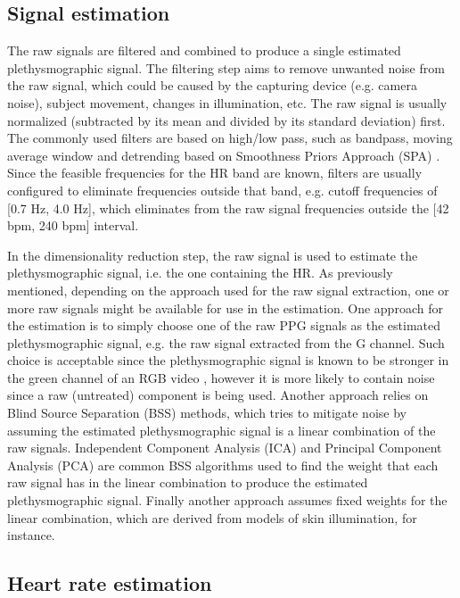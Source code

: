 \subsection{Signal estimation}

The raw signals are filtered and combined to produce a single estimated plethysmographic signal. The filtering step aims to remove unwanted noise from the raw signal, which could be caused by the capturing device (e.g. camera noise), subject movement, changes in illumination, etc. The raw signal is usually normalized (subtracted by its mean and divided by its standard deviation) first. The commonly used filters are based on high/low pass, such as bandpass, moving average window and detrending based on Smoothness Priors Approach (SPA) \parencite{eleuteri2012efficient}. Since the feasible frequencies for the HR band are known, filters are usually configured to eliminate frequencies outside that band, e.g. cutoff frequencies of [0.7 Hz, 4.0 Hz], which eliminates from the raw signal frequencies outside the [42 bpm, 240 bpm] interval.

In the dimensionality reduction step, the raw signal is used to estimate the plethysmographic signal, i.e. the one containing the HR. As previously mentioned, depending on the approach used for the raw signal extraction, one or more raw signals might be available for use in the estimation. One approach for the estimation is to simply choose one of the raw PPG signals as the estimated plethysmographic signal, e.g. the raw signal extracted from the G channel. Such choice is acceptable since the plethysmographic signal is known to be stronger in the green channel of an RGB video \parencite{verkruysse2008remote}, however it is more likely to contain noise since a raw (untreated) component is being used. Another approach relies on Blind Source Separation (BSS) methods, which tries to mitigate noise by assuming the estimated plethysmographic signal is a linear combination of the raw signals. Independent Component Analysis (ICA) \parencite{hyvarinen2000independent} and Principal Component Analysis (PCA) \parencite{jolliffe2002principal} are common BSS algorithms used to find the weight that each raw signal has in the linear combination to produce the estimated plethysmographic signal. Finally another approach assumes fixed weights for the linear combination, which are derived from models of skin illumination, for instance.

\subsection{Heart rate estimation}

